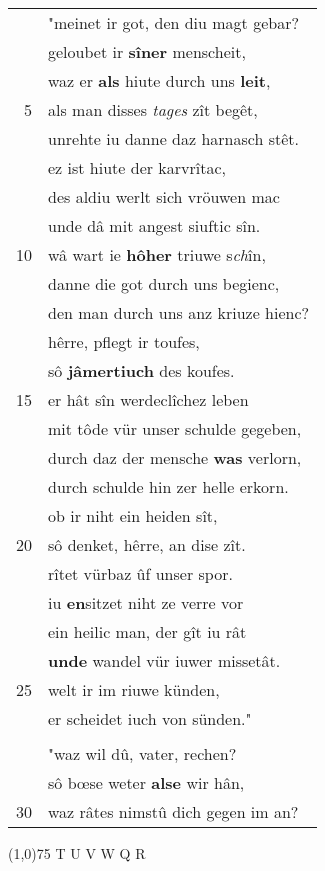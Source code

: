 \documentclass[8pt,a4paper,notitlepage]{article}
\begin{document}
\begin{table}[ht]
\begin{minipage}[t]{0.5\linewidth}
\begin{tabular}{rl}
 & "meinet ir got, den diu magt gebar?\\ 
 & geloubet ir \textbf{sîner} menscheit,\\ 
 & waz er \textbf{als} hiute durch uns \textbf{leit},\\ 
5 & als man disses \textit{tages} zît begêt,\\ 
 & unrehte iu danne daz harnasch stêt.\\ 
 & ez ist hiute der karvrîtac,\\ 
 & des aldiu werlt sich vröuwen mac\\ 
 & unde dâ mit angest siuftic sîn.\\ 
10 & wâ wart ie \textbf{hôher} triuwe s\textit{ch}în,\\ 
 & danne die got durch uns begienc,\\ 
 & den man durch uns anz kriuze hienc?\\ 
 & hêrre, pflegt ir toufes,\\ 
 & sô \textbf{jâmertiuch} des koufes.\\ 
15 & er hât sîn werdeclîchez leben\\ 
 & mit tôde vür unser schulde gegeben,\\ 
 & durch daz der mensche \textbf{was} verlorn,\\ 
 & durch schulde hin zer helle erkorn.\\ 
 & ob ir niht ein heiden sît,\\ 
20 & sô denket, hêrre, an dise zît.\\ 
 & rîtet vürbaz ûf unser spor.\\ 
 & iu \textbf{en}sitzet niht ze verre vor\\ 
 & ein heilic man, der gît iu rât\\ 
 & \textbf{unde} wandel vür iuwer missetât.\\ 
25 & welt ir im riuwe künden,\\ 
 & er scheidet iuch von sünden."\\ 
 & \textit{\begin{large}S\end{large}}îne tohtere begunden sprechen:\\ 
 & "waz wil dû, vater, rechen?\\ 
 & sô bœse weter \textbf{alse} wir hân,\\ 
30 & waz râtes nimstû dich gegen im an?\\ 
\end{tabular}
\scriptsize
\line(1,0){75} \newline
T U V W Q R \newline

\end{minipage}
\end{table}
\end{document}
